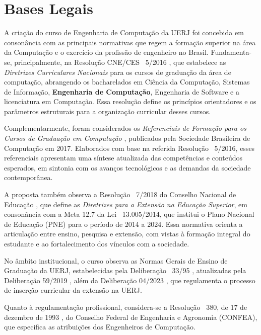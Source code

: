 \chapter{Bases Legais}
\thispagestyle{plain}

A criação do curso de Engenharia de Computação da UERJ foi concebida em consonância com as principais normativas que regem a formação superior na área da Computação e o exercício da profissão de engenheiro no Brasil. Fundamenta-se, principalmente, na Resolução CNE/CES ~5/2016 \cite{cne2016}, que estabelece as \textit{Diretrizes Curriculares Nacionais} para os cursos de graduação da área de computação, abrangendo os bacharelados em Ciência da Computação, Sistemas de Informação, \textbf{Engenharia de Computação}, Engenharia de Software e a licenciatura em Computação. Essa resolução define os princípios orientadores e os parâmetros estruturais para a organização curricular desses cursos.

Complementarmente, foram considerados os \textit{Referenciais de Formação para os Cursos de Graduação em Computação} \cite{sbc2017}, publicados pela Sociedade Brasileira de Computação em 2017. Elaborados com base na referida Resolução ~5/2016, esses referenciais apresentam uma síntese atualizada das competências e conteúdos esperados, em sintonia com os avanços tecnológicos e as demandas da sociedade contemporânea.

A proposta também observa a Resolução ~7/2018 do Conselho Nacional de Educação \cite{cne2018}, que define as \textit{Diretrizes para a Extensão na Educação Superior}, em consonância com a Meta 12.7 da Lei ~13.005/2014, que institui o Plano Nacional de Educação (PNE) para o período de 2014 a 2024. Essa normativa orienta a articulação entre ensino, pesquisa e extensão, com vistas à formação integral do estudante e ao fortalecimento dos vínculos com a sociedade.

No âmbito institucional, o curso observa as Normas Gerais de Ensino de Graduação da UERJ, estabelecidas pela Deliberação ~33/95 \cite{uerj1995}, atualizadas pela Deliberação  59/2019 \cite{uerj2019}, além da Deliberação  04/2023 \cite{uerj2023}, que regulamenta o processo de inserção curricular da extensão na UERJ.

Quanto à regulamentação profissional, considera-se a Resolução ~380, de 17 de dezembro de 1993 \cite{confea1993}, do Conselho Federal de Engenharia e Agronomia (CONFEA), que especifica as atribuições dos Engenheiros de Computação.

